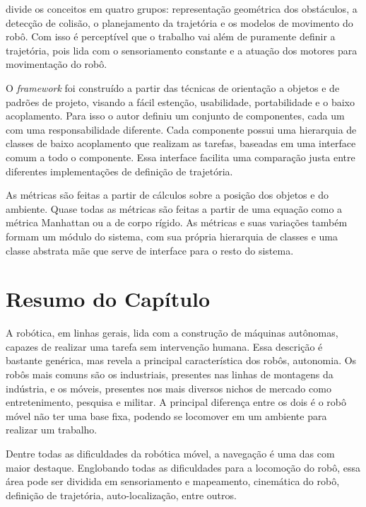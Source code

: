 \cite{Strandberg2004} divide os conceitos em quatro grupos: representação geométrica dos obstáculos, a detecção de colisão, o planejamento da trajetória e os modelos de movimento do robô. Com isso é perceptível que o trabalho vai além de puramente definir a trajetória, pois lida com o sensoriamento constante e a atuação dos motores para movimentação do robô.

O \textit{framework} foi construído a partir das técnicas de orientação a objetos e de padrões de projeto, visando a fácil estenção, usabilidade, portabilidade e o baixo acoplamento. Para isso o autor definiu um conjunto de componentes, cada um com uma responsabilidade diferente. Cada componente possui uma hierarquia de classes de baixo acoplamento que realizam as tarefas, baseadas em uma interface comum a todo o componente. Essa interface facilita uma comparação justa entre diferentes implementações de definição de trajetória.

As métricas são feitas a partir de cálculos sobre a posição dos objetos e do ambiente. Quase todas as métricas são feitas a partir de uma equação como a métrica Manhattan ou a de corpo rígido. As métricas e suas variações também formam um módulo do sistema, com sua própria hierarquia de classes e uma classe abstrata mãe que serve de interface para o resto do sistema.

\section{Resumo do Capítulo}

A robótica, em linhas gerais, lida com a construção de máquinas autônomas, capazes de realizar uma tarefa sem intervenção humana. Essa descrição é bastante genérica, mas revela a principal característica dos robôs, autonomia. Os robôs mais comuns são os industriais, presentes nas linhas de montagens da indústria, e os móveis, presentes nos mais diversos nichos de mercado como entretenimento, pesquisa e militar. A principal diferença entre os dois é o robô móvel não ter uma base fixa, podendo se locomover em um ambiente para realizar um trabalho.

Dentre todas as dificuldades da robótica móvel, a navegação é uma das com maior destaque. Englobando todas as dificuldades para a locomoção do robô, essa área pode ser dividida em sensoriamento e mapeamento, cinemática do robô, definição de trajetória, auto-localização, entre outros.

